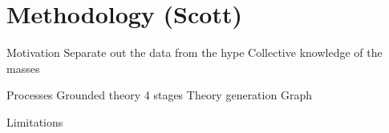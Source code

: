 \section{Methodology (Scott)}

Motivation
	Separate out the data from the hype
	Collective knowledge of the masses

Processes
	Grounded theory
		4 stages
	Theory generation
	Graph

Limitations